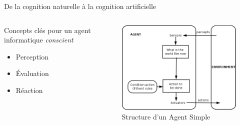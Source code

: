 \documentclass{beamer}
\begin{document}
\begin{frame}{De la cognition naturelle à la cognition artificielle}
\begin{columns}
\begin{column}{0.5\textwidth}
\begin{block}{}
Concepts clés pour un agent informatique \textit{conscient}
\begin{itemize}
    \item Perception
    \item Évaluation
    \item Réaction
\end{itemize}
\end{block}
\end{column}
\begin{column}{0.6\textwidth}
\begin{block}{}
\begin{figure}
    \centering
    \includegraphics[width=\textwidth]{IntelligentAgent-SimpleReflex.png}
    \caption{Structure d'un Agent Simple}
    \label{fig:synapto}
\end{figure}
\end{block}
\end{column}
\end{columns}
\end{frame}
\end{document}
